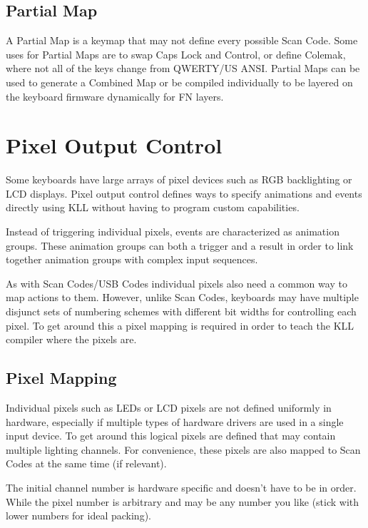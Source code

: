\documentclass{kiibohd-template}
\begin{document}
\section{Partial Map}

A Partial Map is a keymap that may not define every possible Scan Code.
Some uses for Partial Maps are to swap Caps Lock and Control, or define Colemak, where not all of the keys change from QWERTY/US ANSI.
Partial Maps can be used to generate a Combined Map or be compiled individually to be layered on the keyboard firmware dynamically for FN layers.


\chapter{Pixel Output Control}

Some keyboards have large arrays of pixel devices such as RGB backlighting or LCD displays.
Pixel output control defines ways to specify animations and events directly using KLL without having to program custom capabilities.

Instead of triggering individual pixels, events are characterized as animation groups.
These animation groups can both a trigger and a result in order to link together animation groups with complex input sequences.

As with Scan Codes/USB Codes individual pixels also need a common way to map actions to them.
However, unlike Scan Codes, keyboards may have multiple disjunct sets of numbering schemes with different bit widths for controlling each pixel.
To get around this a pixel mapping is required in order to teach the KLL compiler where the pixels are.


\section{Pixel Mapping}

Individual pixels such as LEDs or LCD pixels are not defined uniformly in hardware, especially if multiple types of hardware drivers are used in a single input device.
To get around this logical pixels are defined that may contain multiple lighting channels.
For convenience, these pixels are also mapped to Scan Codes at the same time (if relevant).

The initial channel number is hardware specific and doesn't have to be in order.
While the pixel number is arbitrary and may be any number you like (stick with lower numbers for ideal packing).
\end{document}
